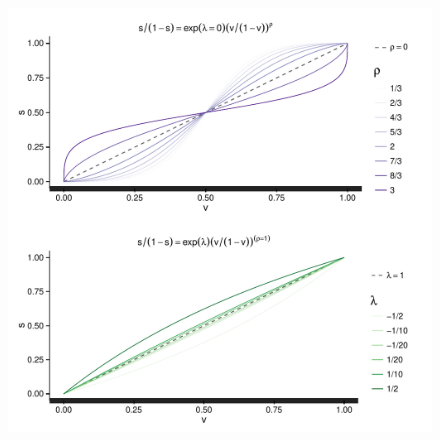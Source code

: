 \begin{figure}[h]
\centering
	\includegraphics[scale=0.75]{sections/figs/seats_votes}
\label{fig:seats_votes}
\end{figure}